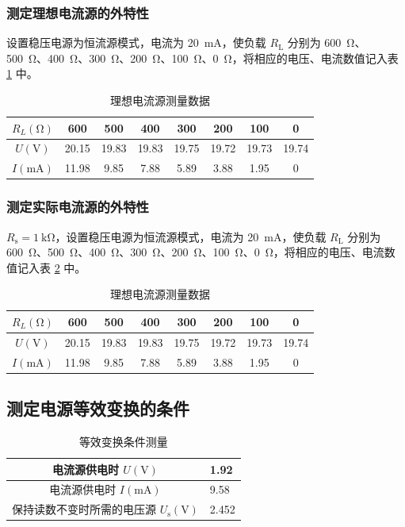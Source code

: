 \documentclass[a4paper,utf8]{article}
\begin{document}
\subsubsection{测定理想电流源的外特性}
设置稳压电源为恒流源模式，电流为 \SI{20}{\mA}，使负载 $R_\text{L}$ 分别为 \SI{600}{\ohm}、\SI{500}{\ohm}、\SI{400}{\ohm}、\SI{300}{\ohm}、\SI{200}{\ohm}、\SI{100}{\ohm}、\SI{0}{\ohm}，将相应的电压、电流数值记入表 \ref{tab:3} 中。
\begin{table}[!ht]
    \centering\begin{tabular}{c c c c c c c c}\toprule
        $R_L (\unit{\ohm})$ & 600 & 500 & 400 & 300 & 200 & 100 & 0 \\ \midrule
        $U (\unit{\V})$ & 20.15 & 19.83 & 19.83 & 19.75 & 19.72 & 19.73 & 19.74 \\
        $I (\unit{\mA})$ & 11.98 & 9.85 & 7.88 & 5.89 & 3.88 & 1.95 & 0 \\ \bottomrule
    \end{tabular}\caption{理想电流源测量数据}\label{tab:3}
\end{table}
\subsubsection{测定实际电流源的外特性}
$R_\text{s}=\SI{1}{\kilo\ohm}$，设置稳压电源为恒流源模式，电流为 \SI{20}{\mA}，使负载 $R_\text{L}$ 分别为 \SI{600}{\ohm}、\SI{500}{\ohm}、\SI{400}{\ohm}、\SI{300}{\ohm}、\SI{200}{\ohm}、\SI{100}{\ohm}、\SI{0}{\ohm}，将相应的电压、电流数值记入表 \ref{tab:4} 中。
\begin{table}[!ht]
    \centering\begin{tabular}{c c c c c c c c}\toprule
        $R_L (\unit{\ohm})$ & 600 & 500 & 400 & 300 & 200 & 100 & 0 \\ \midrule
        $U (\unit{\V})$ & 20.15 & 19.83 & 19.83 & 19.75 & 19.72 & 19.73 & 19.74 \\
        $I (\unit{\mA})$ & 11.98 & 9.85 & 7.88 & 5.89 & 3.88 & 1.95 & 0 \\ \bottomrule
    \end{tabular}\caption{理想电流源测量数据}\label{tab:4}
\end{table}
\subsection{测定电源等效变换的条件}
\begin{table}[!ht]
    \centering\begin{tabular}{|c|>{\hfil}m{5em}|}\hline
        电流源供电时 $U (\unit{\V})$ & 1.92  \\\hline
        电流源供电时 $I (\unit{\mA})$ & 9.58 \\\hline
        保持读数不变时所需的电压源 $U_\text{s} (\unit{\V})$ & 2.452 \\ \hline
    \end{tabular}\caption{等效变换条件测量}
\end{table}
\end{document}
